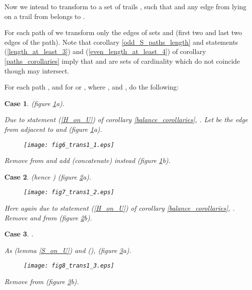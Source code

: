 \documentclass[a4paper, 12pt]{article}
\newtheorem{case}{Case}
\begin{document}
\bigskip

Now we intend to transform  to a set of trails , such that  and any
edge from  lying on a trail from  belongs to .

For each path  of  we transform only the edges of sets
 and  (first two and last two edges of the
path). Note that corollary \ref{odd_S_paths_length} and statements
(\ref{length_at_least_3}) and (\ref{even_length_at_least_4}) of
corollary \ref{paths_corollaries} imply that  and
 are sets of cardinality  which do not coincide though
may intersect.

For each path , and for  or ,
where ,  and , do the following:

\begin{case} \label{case_einH_e'inB}
 (figure \ref{fig_trans1_1}a).

Due to statement (\ref{H_on_U}) of corollary
\ref{balance_corollaries}, . Let  be the edge from
 adjacent to  and  (figure \ref{fig_trans1_1}a).

\begin{figure}[h]
\begin{center}
\texttt{[image: fig6\_trans1\_1.eps]}\\
\caption{}\label{fig_trans1_1}
\end{center}
\end{figure}

Remove  from  and add (concatenate)  instead (figure
\ref{fig_trans1_1}b).
\end{case}

\begin{case} \label{case_einH_e'notinB}
 (hence ) (figure
\ref{fig_trans1_2}a).

\begin{figure}[h]
\begin{center}
\texttt{[image: fig7\_trans1\_2.eps]}\\
\caption{}\label{fig_trans1_2}
\end{center}
\end{figure}

Here again due to statement (\ref{H_on_U}) of corollary
\ref{balance_corollaries}, . Remove  and  from
 (figure \ref{fig_trans1_2}b).
\end{case}

\begin{case} \label{case_einS}
.

As  (lemma \ref{S_on_U}) and  (),  (figure \ref{fig_trans1_3}a).

\begin{figure}[h]
\begin{center}
\texttt{[image: fig8\_trans1\_3.eps]}\\
\caption{}\label{fig_trans1_3}
\end{center}
\end{figure}

Remove  from  (figure \ref{fig_trans1_3}b).
\end{case}
\end{document}
